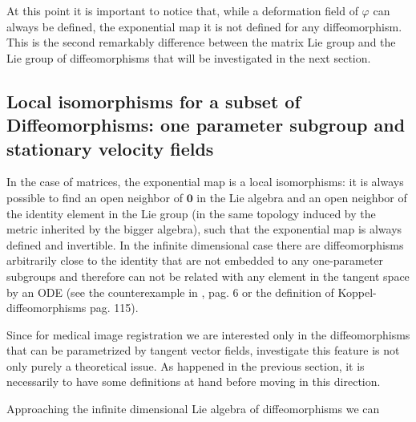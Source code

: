 At this point it is important to notice that, while a deformation field of $\varphi$ can always be defined, the exponential map it is not defined for any diffeomorphism. This is the second remarkably difference between the matrix Lie group and the Lie group of diffeomorphisms that will be investigated in the next section.

\subsection{Local isomorphisms for a subset of Diffeomorphisms: one parameter subgroup and stationary velocity fields}

In the case of matrices, the exponential map is a local isomorphisms: it is always possible to find an open neighbor of $\mathbf{0}$ in the Lie algebra and an open neighbor of the identity element in the Lie group (in the same topology induced by the metric inherited by the bigger algebra), such that the exponential map is always defined and invertible.
In the infinite dimensional case there are diffeomorphisms arbitrarily close to the identity that are not embedded to any one-parameter subgroups and therefore can not be related with any element in the tangent space by an ODE (see the counterexample in \cite{lorenzi2013geodesics}, pag. 6 or the definition of Koppel-diffeomorphisms \cite{grabowski1988free} pag. 115).

Since for medical image registration we are interested only in the diffeomorphisms that can be parametrized by tangent vector fields, investigate this feature is not only purely a theoretical issue. As happened in the previous section, it is necessarily to have some definitions at hand before moving in this direction. 





Approaching the infinite dimensional Lie algebra of diffeomorphisms we can 








%




